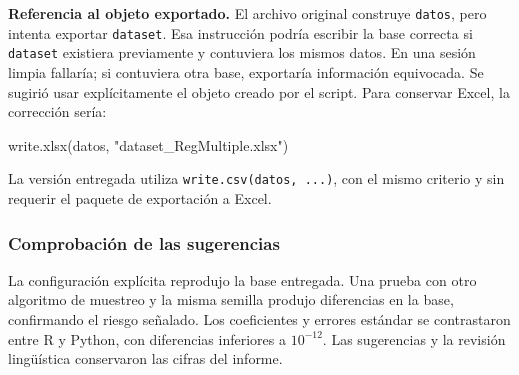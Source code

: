 \documentclass[
  11pt,
  letterpaper,
]{article}
\newenvironment{Shaded}{}{}
\newcommand{\FunctionTok}[1]{\textcolor[rgb]{0.02,0.16,0.49}{#1}}
\newcommand{\NormalTok}[1]{#1}
\newcommand{\StringTok}[1]{\textcolor[rgb]{0.25,0.44,0.63}{#1}}
\begin{document}
\textbf{Referencia al objeto exportado.} El archivo original construye
\texttt{datos}, pero intenta exportar \texttt{dataset}. Esa instrucción
podría escribir la base correcta si \texttt{dataset} existiera
previamente y contuviera los mismos datos. En una sesión limpia
fallaría; si contuviera otra base, exportaría información equivocada. Se
sugirió usar explícitamente el objeto creado por el script. Para
conservar Excel, la corrección sería:

\begin{Shaded}
\begin{Highlighting}[]
\FunctionTok{write.xlsx}\NormalTok{(datos, }\StringTok{"dataset\_RegMultiple.xlsx"}\NormalTok{)}
\end{Highlighting}
\end{Shaded}

La versión entregada utiliza \texttt{write.csv(datos,\ ...)}, con el
mismo criterio y sin requerir el paquete de exportación a Excel.

\hypertarget{comprobaciuxf3n-de-las-sugerencias}{%
\subsubsection{Comprobación de las
sugerencias}\label{comprobaciuxf3n-de-las-sugerencias}}

La configuración explícita reprodujo la base entregada. Una prueba con
otro algoritmo de muestreo y la misma semilla produjo diferencias en la
base, confirmando el riesgo señalado. Los coeficientes y errores
estándar se contrastaron entre R y Python, con diferencias inferiores a
\(10^{-12}\). Las sugerencias y la revisión lingüística conservaron las
cifras del informe.
\end{document}
